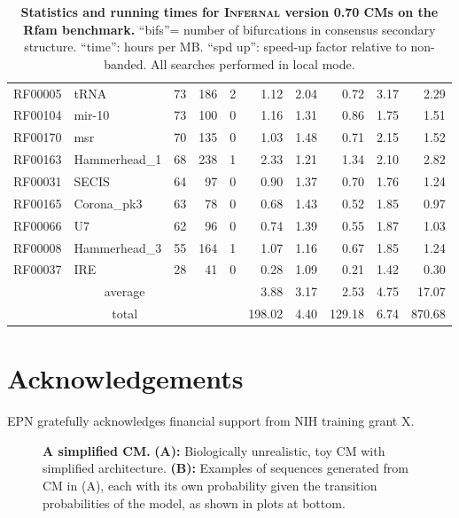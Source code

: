 \documentclass[11pt]{article}
\newif\ifdraft
\begin{document}
\begin{table}
\begin{center}
\begin{tabular}{|ll|rrr|rr|rr|r|}
RF00005 & tRNA & 73 & 186 & 2 & 1.12 & 2.04 & 0.72 & 3.17 & 2.29 \\  
RF00104 & mir-10 & 73 & 100 & 0 & 1.16 & 1.31 & 0.86 & 1.75 & 1.51 \\  
RF00170 & msr & 70 & 135 & 0 & 1.03 & 1.48 & 0.71 & 2.15 & 1.52 \\  
RF00163 & Hammerhead\_1 & 68 & 238 & 1 & 2.33 & 1.21 & 1.34 & 2.10 & 2.82 \\  
RF00031 & SECIS & 64 & 97 & 0 & 0.90 & 1.37 & 0.70 & 1.76 & 1.24 \\  
RF00165 & Corona\_pk3 & 63 & 78 & 0 & 0.68 & 1.43 & 0.52 & 1.85 & 0.97 \\  
RF00066 & U7 & 62 & 96 & 0 & 0.74 & 1.39 & 0.55 & 1.87 & 1.03 \\  
RF00008 & Hammerhead\_3 & 55 & 164 & 1 & 1.07 & 1.16 & 0.67 & 1.85 & 1.24 \\  
RF00037 & IRE & 28 & 41 & 0 & 0.28 & 1.09 & 0.21 & 1.42 & 0.30 \\ \hline 
\multicolumn{5}{|c|}{average} & 3.88 & 3.17 & 2.53 & 4.75 & 17.07 \\ 
\multicolumn{5}{|c|}{total}   & 198.02 & 4.40 & 129.18 & 6.74 & 870.68 \\ \hline 
\end{tabular}
\end{center}

\caption{\textbf{Statistics and running times for
      \textsc{Infernal} version 0.70 CMs on the Rfam benchmark.} ``bifs''=
      number of bifurcations in consensus secondary
      structure. ``time'': hours per MB. ``spd up'': speed-up factor
      relative to non-banded. All searches performed in local mode.}
\label{tbl:rmarkbtimes_l}
\end{table}
\fi

\section{Acknowledgements}
EPN gratefully acknowledges financial support from NIH training grant
X. 

\newpage
%


\ifdraft
 \relax
\else
\newpage
\begin{figure}
\begin{center}
\caption{\textbf{A simplified CM.} \textbf{(A):} Biologically
  unrealistic, toy CM with simplified architecture. \textbf{(B):} Examples of
  sequences generated from CM in (A), each with its own probability
  given the transition probabilities of the model, as shown in plots at
   bottom.}
\label{fig:aprioriAB}
\end{center}
\end{figure}
\end{document}
